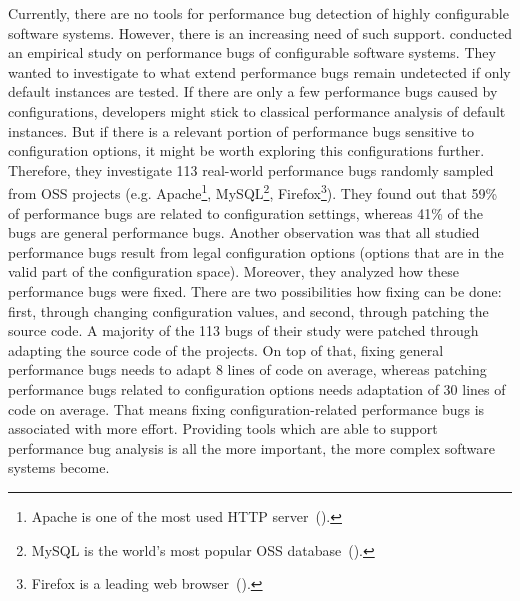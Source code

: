 
Currently, there are no tools for performance bug detection of highly configurable software systems. However, there is an increasing need of such support. 
\cite{Han:2016:ESP:2961111.2962602} conducted an empirical study on performance bugs of configurable software systems. They wanted to investigate to what extend performance bugs remain undetected if only default instances are tested. If there are only a few performance bugs caused by configurations, developers might stick to classical performance analysis of default instances. But if there is a relevant portion of performance bugs sensitive to configuration options, it might be worth exploring this configurations further. Therefore, they investigate 113 real-world performance bugs randomly sampled from \ac{OSS} projects (e.g. Apache\footnote{Apache is one of the most used HTTP server~(\cite{apache2018url}).}, MySQL\footnote{MySQL is the world's most popular \ac{OSS} database~(\cite{mysql2018url}).}, Firefox\footnote{Firefox is a leading web browser~(\cite{firefox2018url}).}). They found out that 59\% of performance bugs are related to configuration settings, whereas 41\% of the bugs are general performance bugs. Another observation was that all studied performance bugs result from legal configuration options (options that are in the valid part of the configuration space). Moreover, they analyzed how these performance bugs were fixed. There are two possibilities how fixing can be done: first, through changing configuration values, and second, through patching the source code. A majority of the 113 bugs of their study were patched through adapting the source code of the projects. On top of that, fixing general performance bugs needs to adapt 8 lines of code on average, whereas patching performance bugs related to configuration options needs adaptation of 30 lines of code on average. That means fixing configuration-related performance bugs is associated with more effort. Providing tools which are able to support performance bug analysis is all the more important, the more complex software systems become.


